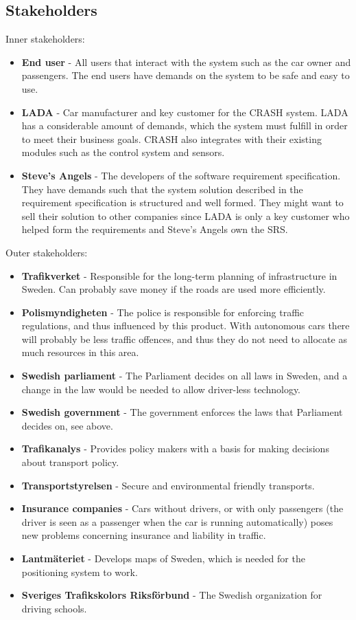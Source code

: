 \documentclass{article}
\begin{document}
\subsection{Stakeholders}
\noindent Inner stakeholders:
\begin{itemize}
\item \textbf{End user} - All users that interact with the system such as the car owner and passengers. The end users have demands on the system to be safe and easy to use.
\item \textbf{LADA} - Car manufacturer and key customer for the CRASH system. LADA has a considerable amount of demands, which the system must fulfill in order to meet their business goals. CRASH also integrates with their existing modules such as the control system and sensors.
\item \textbf{Steve's Angels} - The developers of the software requirement specification. They have demands such that the system solution described in the requirement specification is structured and well formed. They might want to sell their solution to other companies since LADA is only a key customer who helped form the requirements and Steve's Angels own the SRS.
\end{itemize}

\noindent Outer stakeholders:
\begin{itemize}
\item \textbf{Trafikverket} - Responsible for the long-term planning of infrastructure in Sweden. Can probably save money if the roads are used more efficiently. 
\item \textbf{Polismyndigheten} - The police is responsible for enforcing traffic regulations, and thus influenced by this product. With autonomous cars there will probably be less traffic offences, and thus they do not need to allocate as much resources in this area. 
\item \textbf{Swedish parliament} - The Parliament decides on all laws in Sweden, and a change in the law would be needed to allow driver-less technology.
\item \textbf{Swedish government} - The government enforces the laws that Parliament decides on, see above.
\item \textbf{Trafikanalys} - Provides policy makers with a basis for making decisions about transport policy.
\item \textbf{Transportstyrelsen} - Secure and environmental friendly transports.
\item \textbf{Insurance companies} - Cars without drivers, or with only passengers (the driver is seen as a passenger when the car is running automatically) poses new problems concerning insurance and liability in traffic.
\item \textbf{Lantmäteriet} - Develops maps of Sweden, which is needed for the positioning system to work.
\item \textbf{Sveriges Trafikskolors Riksförbund} - The Swedish organization for driving schools.
\end{itemize}
\end{document}
